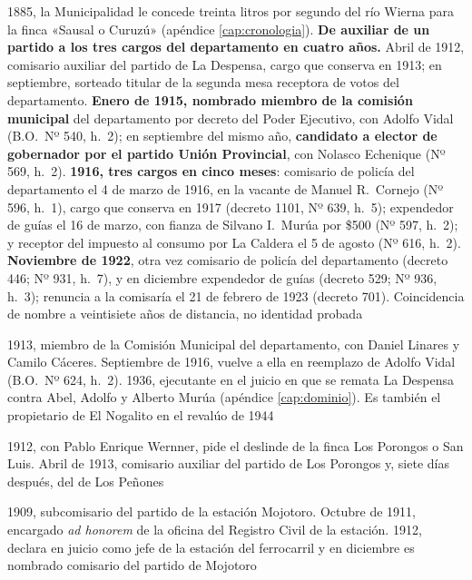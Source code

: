 \begin{personas}
\item[{\textbf{Eustaquio Murúa\index{Murúa, Eustaquio}}}] 1885, la Municipalidad le concede treinta litros por segundo del río Wierna para la finca «Sausal o Curuzú» (apéndice \ref{cap:cronologia}). \textbf{De auxiliar de un partido a los tres cargos del departamento en cuatro años.} Abril de 1912, comisario auxiliar del partido de La Despensa, cargo que conserva en 1913; en septiembre, sorteado titular de la segunda mesa receptora de votos del departamento. \textbf{Enero de 1915, nombrado miembro de la comisión municipal} del departamento por decreto del Poder Ejecutivo, con Adolfo Vidal (B.O.\ Nº 540, h.\ 2); en septiembre del mismo año, \textbf{candidato a elector de gobernador por el partido Unión Provincial}, con Nolasco Echenique (Nº 569, h.\ 2). \textbf{1916, tres cargos en cinco meses}: comisario de policía del departamento el 4 de marzo de 1916, en la vacante de Manuel R.\ Cornejo (Nº 596, h.\ 1), cargo que conserva en 1917 (decreto 1101, Nº 639, h.\ 5); expendedor de guías el 16 de marzo, con fianza de Silvano I.\ Murúa por \$500 (Nº 597, h.\ 2); y receptor del impuesto al consumo por La Caldera el 5 de agosto (Nº 616, h.\ 2). \textbf{Noviembre de 1922}, otra vez comisario de policía del departamento (decreto 446; Nº 931, h.\ 7), y en diciembre expendedor de guías (decreto 529; Nº 936, h.\ 3); renuncia a la comisaría el 21 de febrero de 1923 (decreto 701). Coincidencia de nombre a veintisiete años de distancia, no identidad probada

\item[{\textbf{Salvador Rosa\index{Rosa, Salvador}}}] 1913, miembro de la Comisión Municipal del departamento, con Daniel Linares y Camilo Cáceres. Septiembre de 1916, vuelve a ella en reemplazo de Adolfo Vidal (B.O.\ Nº 624, h.\ 2). 1936, ejecutante en el juicio en que se remata La Despensa contra Abel, Adolfo y Alberto Murúa (apéndice \ref{cap:dominio}). Es también el propietario de El Nogalito en el revalúo de 1944

\item[{\textbf{Enrique Leconte\index{Leconte, Enrique}}}] 1912, con Pablo Enrique Wernner, pide el deslinde de la finca Los Porongos o San Luis. Abril de 1913, comisario auxiliar del partido de Los Porongos y, siete días después, del de Los Peñones

\item[{\textbf{Benjamín López\index{López, Benjamín}}}] 1909, subcomisario del partido de la estación Mojotoro. Octubre de 1911, encargado \textit{ad honorem} de la oficina del Registro Civil de la estación. 1912, declara en juicio como jefe de la estación del ferrocarril y en diciembre es nombrado comisario del partido de Mojotoro


\end{personas}
